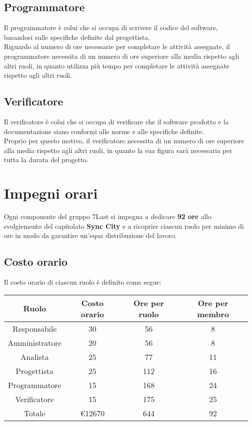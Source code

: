 \documentclass[italian,12pt]{article} %
\begin{document}
\subsection{Programmatore}
Il programmatore è colui che si occupa di scrivere il codice del software, basandosi sulle specifiche definite dal progettista.\\
Riguardo al numero di ore necessarie per completare le attività assegnate, il programmatore necessita di un numero di ore superiore alla media rispetto agli altri ruoli,
in quanto utilizza più tempo per completare le attività assegnate rispetto agli altri ruoli.

\subsection{Verificatore}
Il verificatore è colui che si occupa di verificare che il software prodotto e la documentazione siano conformi alle norme e alle specifiche definite.\\
Proprio per questo motivo, il verificatore necessita di un numero di ore superiore alla media rispetto agli altri ruoli, in quanto la sua figura sarà necessaria per tutta la durata del progetto.

\newpage
\section{Impegni orari}
Ogni componente del gruppo 7Last si impegna a dedicare \textbf{92 ore} allo svolgiemento del capitolato \textbf{Sync City} e a ricoprire ciascun ruolo per minimo di ore in modo da garantire un'equa distribuzione del lavoro.

\subsection{Costo orario}
Il costo orario di ciascun ruolo è definito come segue:

\begin{table}[!h]
	\begin{center}
		\begin{tabular}{ |c|c|c|c| }
			\hline
			Ruolo          & Costo orario & Ore per ruolo & Ore per membro \\
			\hline
			Responsabile   & 30           & 56            & 8              \\
			Amministratore & 20           & 56            & 8              \\
			Analista       & 25           & 77            & 11             \\
			Progettista    & 25           & 112           & 16             \\
			Programmatore  & 15           & 168           & 24             \\
			Verificatore   & 15           & 175           & 25             \\
			\hline
			Totale         & €12670       & 644           & 92             \\
			\hline
		\end{tabular}
	\end{center}
\end{table}
\end{document}
